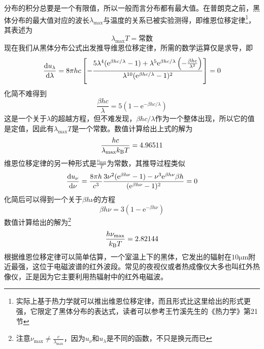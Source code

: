 \documentclass[../../main.tex]{subfiles}
\begin{document}
分布的积分总要是一个有限值，所以一般而言分布都有最大值。在普朗克之前，黑体分布的最大值对应的波长\(\lambda_{\text{max}}\)与温度的关系已被实验测得，即维恩位移定律\footnote{实际上基于热力学就可以推出维恩位移定律，而且形式比这里给出的形式更强，它限定了黑体分布的表达式，读者可以参考王竹溪先生的《热力学》第21节}，其表述为
\begin{equation}
    \lambda_{\text{max}}T=\text{常数}
\end{equation}
现在我们从黑体分布公式出发推导维恩位移定律，所需的数学运算仅是求导，即
\begin{equation}
    \dv{u_{\lambda}}{\lambda}=8\pi hc\left[-\frac{5\lambda^4(\mathrm{e}^{\beta hc/\lambda}-1)+\lambda^5\mathrm{e}^{\beta hc/\lambda}\left(-\frac{\beta hc}{\lambda^2}\right)}{\lambda^{10}(\mathrm{e}^{\beta hc/\lambda}-1)^2}\right]=0
\end{equation}
化简不难得到
\begin{equation}
    \frac{\beta hc}{\lambda}=5(1-\mathrm{e}^{-\beta hc/\lambda})
\end{equation}
这是一个关于\(\lambda\)的超越方程，但不难发现，\(\beta hc/\lambda\)作为一个整体出现，所以它的值是定值，因此有\(\lambda_{\text{max}}T\)是一个常数。数值计算给出上式的解为
\begin{equation}
    \frac{hc}{\lambda_{\text{max}}k_{\mathrm{B}} T}=4.96511
\end{equation}
维恩位移定律的另一种形式是\(\displaystyle \frac{\nu_{\text{max}}}{T}\)为常数，其推导过程类似
\begin{equation}
    \dv{u_{\nu}}{\nu}=\frac{8\pi h}{c^3}\frac{3\nu^2(\mathrm{e}^{\beta h\nu}-1)-\nu^3\mathrm{e}^{\beta h\nu}\beta h}{(\mathrm{e}^{\beta h\nu}-1)^2}=0
\end{equation}
化简后可以得到一个关于\(\beta h\nu\)的方程
\begin{equation}
    \beta h\nu=3(1-\mathrm{e}^{-\beta h\nu})
\end{equation}
数值计算给出的解为\footnote{注意\(\nu_{\text{max}}\neq\frac{c}{\lambda_{\text{max}}}\)，因为\(u_{\nu}\)和\(u_{\lambda}\)是不同的函数，不只是换元而已}
\begin{equation}
    \frac{h\nu_{\text{max}}}{k_{\mathrm{B}} T}=2.82144
\end{equation}
根据维恩位移定律可以简单估算，一个室温上下的黑体，它发出的辐射在\(10\mathrm{\mu m}\)附近最强，这位于电磁波谱的红外波段。常见的夜视仪或者热成像仪大多也叫红外热像仪，正是因为它主要利用热辐射中的红外电磁波。
\end{document}
